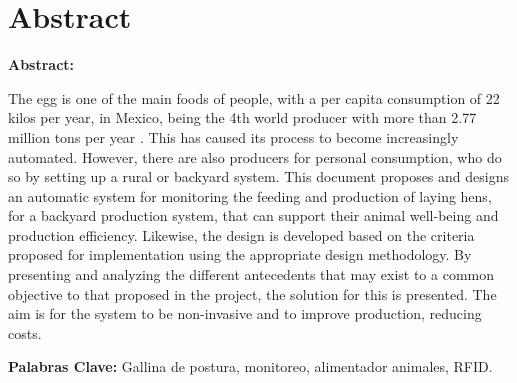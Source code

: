 \chapter{Abstract}

\textbf{Abstract:}

The egg is one of the main foods of people, with a per capita consumption of 22 kilos per year, in Mexico, being the 4th world producer with more than 2.77 million tons per year \cite{AGRICULTURA}. This has caused its process to become increasingly automated. However, there are also producers for personal consumption, who do so by setting up a rural or backyard system. This document proposes and designs an automatic system for monitoring the feeding and production of laying hens, for a backyard production system, that can support their animal well-being and production efficiency. Likewise, the design is developed based on the criteria proposed for implementation using the appropriate design methodology. By presenting and analyzing the different antecedents that may exist to a common objective to that proposed in the project, the solution for this is presented. The aim is for the system to be non-invasive and to improve production, reducing costs.


\textbf{Palabras Clave:}  Gallina de postura, monitoreo, alimentador animales, RFID.



\endinput 